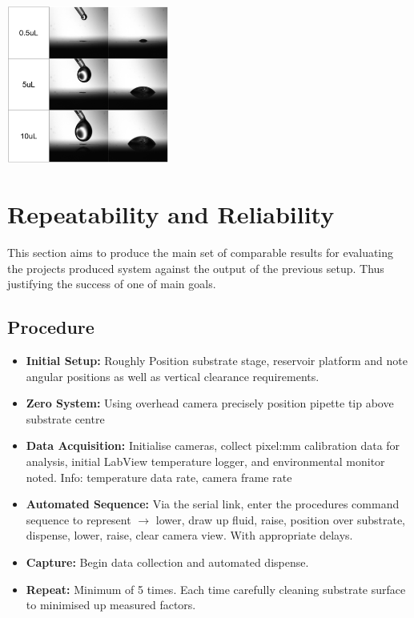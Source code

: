 \begin{center}
    \includegraphics[width=0.4\textwidth]{img/volume_range.png}
\end{center}

\section{Repeatability and Reliability}

This section aims to produce the main set of comparable results for evaluating the projects produced system against the output of the previous setup. Thus justifying the success of one of main goals.

\subsection{Procedure}
\begin{itemize}
    \item \textbf{Initial Setup:} Roughly Position substrate stage, reservoir platform and note angular positions as well as vertical clearance requirements.
    \item \textbf{Zero System:} Using overhead camera precisely position pipette tip above substrate centre
    \item \textbf{Data Acquisition:} Initialise cameras, collect pixel:mm calibration data for analysis, initial LabView temperature logger, and environmental monitor noted. Info: temperature data rate, camera frame rate
    \item \textbf{Automated Sequence:} Via the serial link, enter the procedures command sequence to represent $\rightarrow$ lower, draw up fluid, raise, position over substrate, dispense, lower, raise, clear camera view. With appropriate delays.
    \item \textbf{Capture:} Begin data collection and automated dispense.
    \item \textbf{Repeat: } Minimum of 5 times. Each time carefully cleaning substrate surface to minimised up measured factors. 
\end{itemize}

